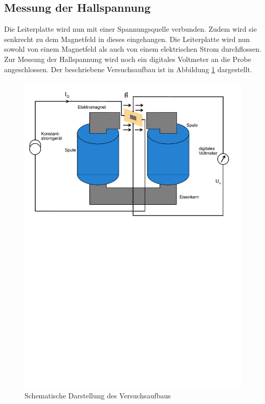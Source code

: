 \subsection{Messung der Hallspannung}
Die Leiterplatte wird nun mit einer Spannungsquelle verbunden. Zudem wird sie 
senkrecht zu dem Magnetfeld in dieses eingehangen. Die Leiterplatte wird nun sowohl von einem Magnetfeld
als auch von einem elektrischen Strom durchflossen. Zur Messung der Hallspannung wird noch ein 
digitales Voltmeter an die Probe angeschlossen. Der beschriebene Versuchsaufbau ist in Abbildung
\ref{fig:versuchsanordnung} dargestellt.\\
%
\begin{figure}[H]
    \centering
    \includegraphics[scale = 0.3]{content/1Versuchsaufbau.pdf}
    \caption{Schematische Darstellung des Versuchsaufbaus}
    \label{fig:versuchsanordnung}
\end{figure}
